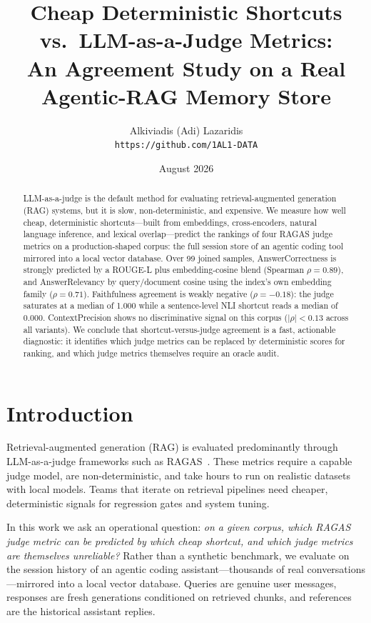 \documentclass[11pt]{article}
\title{Cheap Deterministic Shortcuts vs.\ LLM-as-a-Judge Metrics:\\An Agreement Study on a Real Agentic-RAG Memory Store}
\author{Alkiviadis (Adi) Lazaridis\\\small \texttt{https://github.com/1AL1-DATA}}
\date{August 2026}
\begin{document}
\maketitle

\begin{abstract}
LLM-as-a-judge is the default method for evaluating retrieval-augmented
generation (RAG) systems, but it is slow, non-deterministic, and expensive.
We measure how well cheap, deterministic shortcuts---built from embeddings,
cross-encoders, natural language inference, and lexical overlap---predict the
rankings of four RAGAS judge metrics on a production-shaped corpus: the full
session store of an agentic coding tool mirrored into a local vector database.
Over 99 joined samples, AnswerCorrectness is strongly predicted by a
ROUGE-L plus embedding-cosine blend (Spearman $\rho=0.89$), and
AnswerRelevancy by query/document cosine using the index's own embedding
family ($\rho=0.71$). Faithfulness agreement is weakly negative
($\rho=-0.18$): the judge saturates at a median of 1.000 while a sentence-level
NLI shortcut reads a median of 0.000. ContextPrecision shows no
discriminative signal on this corpus ($|\rho|<0.13$ across all variants).
We conclude that shortcut-versus-judge agreement is a fast, actionable
diagnostic: it identifies which judge metrics can be replaced by deterministic
scores for ranking, and which judge metrics themselves require an oracle audit.
\end{abstract}

\section{Introduction}\label{sec:intro}

Retrieval-augmented generation (RAG) is evaluated predominantly through
LLM-as-a-judge frameworks such as RAGAS~\cite{es2023ragas}. These metrics
require a capable judge model, are non-deterministic, and take hours to run
on realistic datasets with local models. Teams that iterate on retrieval
pipelines need cheaper, deterministic signals for regression gates and
system tuning.

In this work we ask an operational question: \emph{on a given corpus, which
RAGAS judge metric can be predicted by which cheap shortcut, and which judge
metrics are themselves unreliable?} Rather than a synthetic benchmark, we
evaluate on the session history of an agentic coding assistant---thousands of
real conversations---mirrored into a local vector database. Queries are
genuine user messages, responses are fresh generations conditioned on
retrieved chunks, and references are the historical assistant replies.
\end{document}
